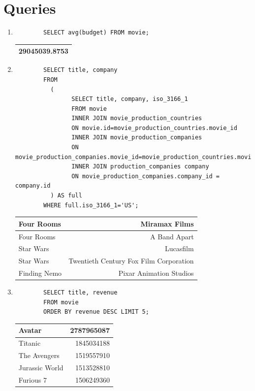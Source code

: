 \documentclass[11pt]{article}
\begin{document}
\section{Queries}
\begin{enumerate}
	\item
		\begin{lstlisting}
		SELECT avg(budget) FROM movie;
		\end{lstlisting}
  		\begin{tabular}{| c | }
    			\hline
    				29045039.8753 \\
    			\hline
  		\end{tabular}

	\item
		\begin{lstlisting}
		SELECT title, company
		FROM
	  	  (
	    	    SELECT title, company, iso_3166_1
	    	    FROM movie
	    	    INNER JOIN movie_production_countries
	    	    ON movie.id=movie_production_countries.movie_id
	    	    INNER JOIN movie_production_companies
	    	    ON movie_production_companies.movie_id=movie_production_countries.movie_id
	    	    INNER JOIN production_companies company
	    	    ON movie_production_companies.company_id = company.id
	  	  ) AS full
		WHERE full.iso_3166_1='US';
		\end{lstlisting}
		\begin{tabular}[t]{| l | r | }
			\hline
			Four Rooms & Miramax Films \\ \hline
			Four Rooms & A Band Apart \\ \hline
			Star Wars & Lucasfilm \\ \hline
			Star Wars & Twentieth Century Fox Film Corporation \\ \hline
			Finding Nemo & Pixar Animation Studios \\
			\hline
		\end{tabular}
	\item
		\begin{lstlisting}
		SELECT title, revenue
		FROM movie
		ORDER BY revenue DESC LIMIT 5;
		\end{lstlisting}
		\begin{tabular}[t]{| l | r | }
			\hline
			Avatar & 2787965087 \\ \hline
			Titanic & 1845034188 \\ \hline
			The Avengers & 1519557910 \\ \hline
			Jurassic World & 1513528810 \\ \hline
			Furious 7 & 1506249360 \\

\end{tabular}
\end{enumerate}
\end{document}
